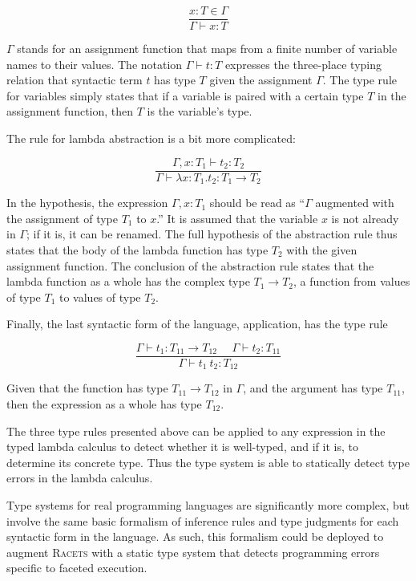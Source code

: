 \documentclass{article}
\begin{document}
\[
\frac{x : T \in \Gamma}
{\Gamma \vdash x : T}
\]

$\Gamma$ stands for an assignment function that maps from a finite number of variable names to their values. The notation $\Gamma \vdash t : T$ expresses the three-place typing relation that syntactic term $t$ has type $T$ given the assignment $\Gamma$. The type rule for variables simply states that if a variable is paired with a certain type $T$ in the assignment function, then $T$ is the variable's type.

The rule for lambda abstraction is a bit more complicated:

\[
\frac{\Gamma, x : T_1 \vdash t_2 : T_2}
{\Gamma \vdash \lambda x : T_1 . t_2 : T_1 \to T_2}
\]

In the hypothesis, the expression $\Gamma, x : T_1$ should be read as ``$\Gamma$ augmented with the assignment of type $T_1$ to $x$.'' It is assumed that the variable $x$ is not already in $\Gamma$; if it is, it can be renamed. The full hypothesis of the abstraction rule thus states that the body of the lambda function has type $T_2$ with the given assignment function. The conclusion of the abstraction rule states that the lambda function as a whole has the complex type $T_1 \to T_2$, a function from values of type $T_1$ to values of type $T_2$.

Finally, the last syntactic form of the language, application, has the type rule

\[
\frac{\Gamma \vdash t_1 : T_{11} \to T_{12}\ \ \ \ \ \ \Gamma \vdash t_2 : T_{11}}
{\Gamma \vdash t_1\ t_2 : T_{12}}
\]

Given that the function has type $T_{11} \to T_{12}$ in $\Gamma$, and the argument has type $T_{11}$, then the expression as a whole has type $T_{12}$.

The three type rules presented above can be applied to any expression in the typed lambda calculus to detect whether it is well-typed, and if it is, to determine its concrete type. Thus the type system is able to statically detect type errors in the lambda calculus.

Type systems for real programming languages are significantly more complex, but involve the same basic formalism of inference rules and type judgments for each syntactic form in the language. As such, this formalism could be deployed to augment \textsc{Racets} with a static type system that detects programming errors specific to faceted execution.
\end{document}
